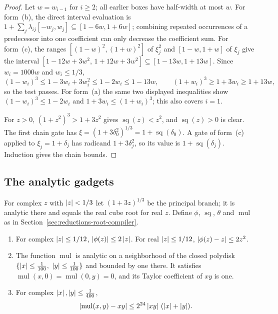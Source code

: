 \begin{proof}
Let $w=w_{i-1}$ for $i\ge2$; all earlier boxes have half-width at most $w$.
For form~(b), the direct interval evaluation is
$1+\sum_j\lambda_{ij}[-w_j,w_j]\subseteq[1-6w,1+6w]$; combining repeated
occurrences of a predecessor into one coefficient can only decrease the
coefficient sum. For form~(c), the ranges $[(1-w)^2,(1+w)^2]$ of $\xi_j^2$ and
$[1-w,1+w]$ of $\xi_j$ give the interval $[1-12w+3w^2,\,1+12w+3w^2]
\subseteq[1-13w,1+13w]$. Since $w_i=1000w$ and $w_i\le1/3$,
\[
 (1-w_i)^3\le1-3w_i+3w_i^2\le1-2w_i\le1-13w,\qquad
 (1+w_i)^3\ge1+3w_i\ge1+13w,
\]
so the test passes. For form~(a) the same two displayed inequalities show
$(1-w_i)^3\le1-2w_i$ and $1+3w_i\le(1+w_i)^3$; this also covers $i=1$.

For $z>0$, $(1+z^2)^3>1+3z^2$ gives $\operatorname{sq}(z)<z^2$, and
$\operatorname{sq}(z)>0$ is clear. The first chain gate has
$\xi=(1+3\delta_0^2)^{1/3}=1+\operatorname{sq}(\delta_0)$. A gate of form~(c)
applied to $\xi_j=1+\delta_j$ has radicand $1+3\delta_j^2$, so its value is
$1+\operatorname{sq}(\delta_j)$. Induction gives the chain bounds.
\end{proof}

\subsection{The analytic gadgets}
\label{app:reductions-gadgets}

For complex $z$ with $\left\lvert z\right\rvert<1/3$ let $(1+3z)^{1/3}$ be the principal branch;
it is analytic there and equals the real cube root for real $z$. Define
$\phi$, $\operatorname{sq}$, $\theta$ and $\operatorname{mul}$ as in
Section~\ref{sec:reductions-root-compiler}.

\begin{lemma}
\label{lem:reductions-analytic}
\leavevmode
\begin{enumerate}[label=(\roman*)]
\item For complex $\left\lvert z\right\rvert\le1/12$, $\left\lvert\phi(z)\right\rvert\le2\left\lvert z\right\rvert$. For real
$\left\lvert z\right\rvert\le1/12$, $\left\lvert\phi(z)-z\right\rvert\le2z^2$.
\item The function $\operatorname{mul}$ is analytic on a neighborhood of the
closed polydisk $\{\left\lvert x\right\rvert\le\frac1{100},\ \left\lvert y\right\rvert\le\frac1{100}\}$ and bounded by
one there. It satisfies $\operatorname{mul}(x,0)=\operatorname{mul}(0,y)=0$, and
its Taylor coefficient of $xy$ is one.
\item For complex $\left\lvert x\right\rvert,\left\lvert y\right\rvert\le\frac1{400}$,
\[
 \left\lvert\operatorname{mul}(x,y)-xy\right\rvert\le2^{24}\left\lvert xy\right\rvert\,(\left\lvert x\right\rvert+\left\lvert y\right\rvert).
\]
\end{enumerate}
\end{lemma}

